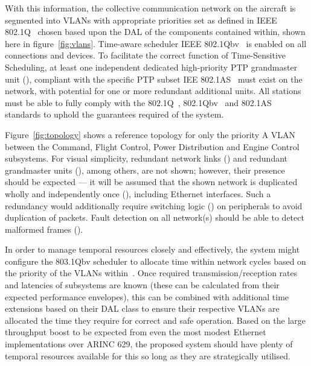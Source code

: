 With this information, the collective communication network on the aircraft is segmented into VLANs with appropriate priorities set as defined in IEEE 802.1Q~\cite{IEEEStandardLocal2022} chosen based upon the DAL of the components contained within, shown here in figure~\ref{fig:vlans}.
Time-aware scheduler IEEE 802.1Qbv~\cite{IEEEStandardLocal2018a,ISOIECIEEE2018} is enabled on all connections and devices.
To facilitate the correct function of Time-Sensitive Scheduling, at least one independent dedicated high-priority PTP grandmaster unit (), compliant with the specific PTP subset IEE 802.1AS~\cite{IEEEStandardLocal2020} must exist on the network, with potential for one or more redundant additional units.
All stations must be able to fully comply with the 802.1Q~\cite{IEEEStandardLocal2018a}, 802.1Qbv~\cite{IEEEStandardLocal2016a} and 802.1AS~\cite{IEEEStandardLocal2020} standards to uphold the guarantees required of the system.

Figure~\ref{fig:topology} shows a reference topology for only the priority A VLAN between the Command, Flight Control, Power Distribution and Engine Control subsystems.
For visual simplicity, redundant network links () and redundant grandmaster units (), among others, are not shown; however, their presence should be expected --- it will be assumed that the shown network is duplicated wholly and independently once (), including Ethernet interfaces.
Such a redundancy would additionally require switching logic () on peripherals to avoid duplication of packets.
Fault detection on all network(s) should be able to detect malformed frames ().

In order to manage temporal resources closely and effectively, the system might configure the 803.1Qbv scheduler to allocate time within network cycles based on the priority of the VLANs within~\cite{IEEEStandardLocal2016a}.
Once required transmission/reception rates and latencies of subsystems are known (these can be calculated from their expected performance envelopes), this can be combined with additional time extensions based on their DAL class to ensure their respective VLANs are allocated the time they require for correct and safe operation.
Based on the large throughput boost to be expected from even the most modest Ethernet implementations over ARINC 629, the proposed system should have plenty of temporal resources available for this so long as they are strategically utilised.

